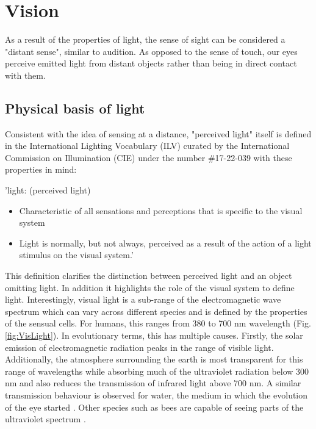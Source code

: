 \section{Vision}

As a result of the properties of light, the sense of sight can be considered a "distant sense", similar to audition. As opposed to the sense of touch, our eyes perceive emitted light from distant objects rather than being in direct contact with them.

\subsection{Physical basis of light}

Consistent with the idea of sensing at a distance, "perceived light" itself is defined in the International Lighting Vocabulary (ILV) curated by the International Commission on Illumination (CIE) under the number \#17-22-039 with these properties in mind:

'light:
(perceived light)

\begin{itemize}
 \item Characteristic of all sensations and perceptions that is specific to the visual system
 \item Light is normally, but not always, perceived as a result of the action of a light stimulus on the visual system.'
\end{itemize}

This definition clarifies the distinction between perceived light and an object omitting light. In addition it highlights the role of the visual system to define light. 
Interestingly, visual light is a sub-range of the electromagnetic wave spectrum which can vary across different species and is defined by the properties of the sensual cells. For humans, this ranges from 380 to 700 nm wavelength (Fig. \ref{fig:VisLight}). In evolutionary terms, this has multiple causes.
Firstly, the solar emission of electromagnetic radiation peaks in the range of visible light. Additionally, the atmosphere surrounding the earth is most transparent for this range of wavelengths while absorbing much of the ultraviolet radiation below 300 nm and also reduces the transmission of infrared light above 700 nm. 
A similar transmission behaviour is observed for water, the medium in which the evolution of the eye started \parencite{born2013principles}.
Other species such as bees are capable of seeing parts of the ultraviolet spectrum \parencite{slineyWhat2016}.

